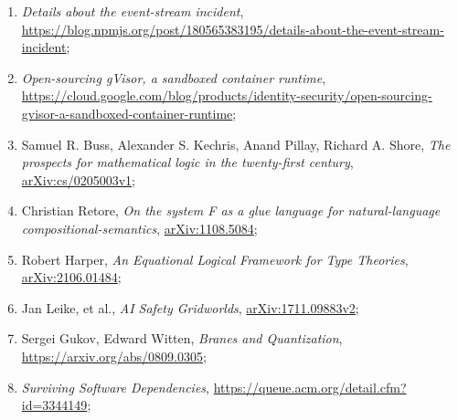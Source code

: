 \documentclass[a4paper,11pt]{article}
\begin{document}
\begin{enumerate}
\item \emph{Details about the event-stream incident},
  \href{https://blog.npmjs.org/post/180565383195/details-about-the-event-stream-incident}{https://blog.npmjs.org/post/180565383195/details-about-the-event-stream-incident};

\item \emph{Open-sourcing gVisor, a sandboxed container runtime},
  \href{https://cloud.google.com/blog/products/identity-security/open-sourcing-gvisor-a-sandboxed-container-runtime}{https://cloud.google.com/blog/products/identity-security/open-sourcing-gvisor-a-sandboxed-container-runtime};

\item Samuel R. Buss, Alexander S. Kechris, Anand Pillay, Richard A.
  Shore, \emph{The prospects for mathematical logic in the
    twenty-first century},
  \href{https://arxiv.org/abs/cs/0205003v1}{arXiv:cs/0205003v1};

\item Christian Retore, \emph{On the system F as a glue language for
    natural-language compositional-semantics},
  \href{https://arxiv.org/abs/1108.5084}{arXiv:1108.5084};

\item Robert Harper, \emph{An Equational Logical Framework for Type
    Theories},
  \href{https://arxiv.org/abs/2106.01484}{arXiv:2106.01484};

\item Jan Leike, et al., \emph{AI Safety Gridworlds}, \href{https://arxiv.org/abs/1711.09883}{arXiv:1711.09883v2};

\item Sergei Gukov, Edward Witten, \emph{Branes and Quantization},
  \href{https://arxiv.org/abs/0809.0305}{https://arxiv.org/abs/0809.0305};




















\item \emph{Surviving Software Dependencies},
  \href{https://queue.acm.org/detail.cfm?id=3344149}{https://queue.acm.org/detail.cfm?id=3344149};

\end{enumerate}











\end{document}
